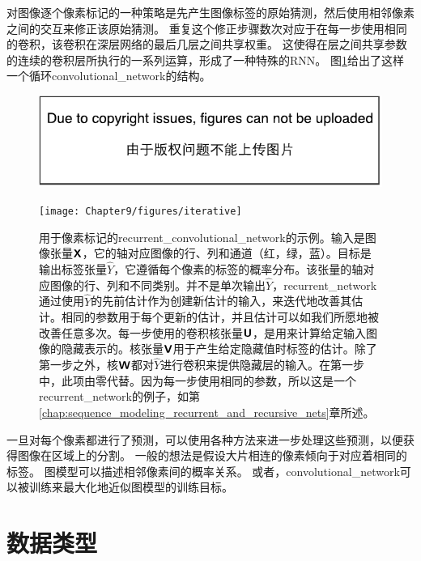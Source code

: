 对图像逐个像素标记的一种策略是先产生图像标签的原始猜测，然后使用相邻像素之间的交互来修正该原始猜测。
重复这个修正步骤数次对应于在每一步使用相同的卷积，该卷积在深层网络的最后几层之间共享权重\citep{jain2007supervised}。
这使得在层之间共享参数的连续的卷积层所执行的一系列运算，形成了一种特殊的\gls{RNN}\citep{Pinheiro+Collobert-ICML2014,Pinheiro+Collobert-CVPR2015}。
图\ref{fig:chap9_iterative}给出了这样一个循环\gls{convolutional_network}的结构。
\begin{figure}[!htb]
\ifOpenSource
\centerline{\includegraphics{figure.pdf}}
\else
\centerline{\texttt{[image: Chapter9/figures/iterative]}}
\fi
\captionsetup{singlelinecheck=off}
\caption[.]{用于像素标记的\gls{recurrent_convolutional_network}的示例。输入是图像张量$\textsf{\textbf{X}}$，它的轴对应图像的行、列和通道（红，绿，蓝）。目标是输出标签张量$\mathit{\hat{Y}}$，它遵循每个像素的标签的概率分布。该张量的轴对应图像的行、列和不同类别。并不是单次输出$\mathit{\hat{Y}}$，\gls{recurrent_network}通过使用$\mathit{\hat{Y}}$的先前估计作为创建新估计的输入，来迭代地改善其估计。相同的参数用于每个更新的估计，并且估计可以如我们所愿地被改善任意多次。每一步使用的卷积核张量$\textsf{\textbf{U}}$，是用来计算给定输入图像的隐藏表示的。核张量$\textsf{\textbf{V}}$用于产生给定隐藏值时标签的估计。除了第一步之外，核$\textsf{\textbf{W}}$都对$\mathit{\hat{Y}}$进行卷积来提供隐藏层的输入。在第一步中，此项由零代替。因为每一步使用相同的参数，所以这是一个\gls{recurrent_network}的例子，如第\ref{chap:sequence_modeling_recurrent_and_recursive_nets}章所述。}
\label{fig:chap9_iterative}
\end{figure}

 
一旦对每个像素都进行了预测，可以使用各种方法来进一步处理这些预测，以便获得图像在区域上的分割\citep{Briggman-et-al-NIPS2009,Turaga2010,Farabet-et-al-2013}。
一般的想法是假设大片相连的像素倾向于对应着相同的标签。
图模型可以描述相邻像素间的概率关系。
或者，\gls{convolutional_network}可以被训练来最大化地近似图模型的训练目标\citep{Ning-et-al-2005,Thompson-et-al-NIPS2014}。

\section{数据类型}
\label{sec:data_types}

